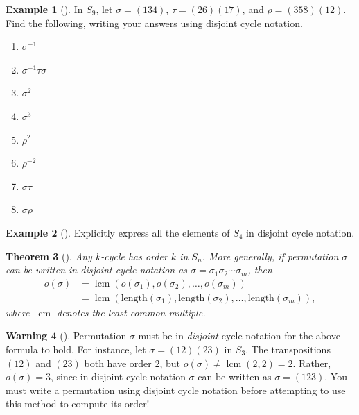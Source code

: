 \documentclass[10pt,]{book}
\theoremstyle{plain}
\newtheorem{theorem}{Theorem}[section]
\theoremstyle{definition}
\theoremstyle{definition}
\newtheorem{warning}[theorem]{Warning}
\theoremstyle{definition}
\newtheorem{example}[theorem]{Example}
\theoremstyle{definition}
\numberwithin{equation}{section}
\DeclareMathOperator{\lcm}{lcm}
\newcommand{\amp}{&}
\begin{document}
\begin{example}[]\label{s9ex}
In \(S_9\), let \(\sigma=(134)\), \(\tau=(26)(17)\), and \(\rho=(358)(12)\). Find the following, writing your answers using disjoint cycle notation.%
\leavevmode%
\begin{multicols}{4}
\begin{enumerate}[label=\alph*]
\item\hypertarget{li-333}{}\(\sigma^{-1}\)%
\item\hypertarget{li-334}{}\(\sigma^{-1}\tau\sigma\)%
\item\hypertarget{li-335}{}\(\sigma^2\)%
\item\hypertarget{li-336}{}\(\sigma^3\)%
\item\hypertarget{li-337}{}\(\rho^2\)%
\item\hypertarget{li-338}{}\(\rho^{-2}\)%
\item\hypertarget{li-339}{}\(\sigma \tau\)%
\item\hypertarget{li-340}{}\(\sigma \rho\)%
\end{enumerate}
\end{multicols}
\end{example}
\begin{example}[]\label{example-56}
Explicitly express all the elements of \(S_4\) in disjoint cycle notation.%
\end{example}
\begin{theorem}[{}]\label{kcyc}
Any \(k\)-cycle has order \(k\) in \(S_n\). More generally, if permutation \(\sigma\) can be written in disjoint cycle notation as \(\sigma=\sigma_1 \sigma_2 \cdots \sigma_m\), then%
\begin{align*}
o(\sigma)\amp =\lcm(o(\sigma_1), o(\sigma_2),\ldots, o(\sigma_m))\\
\amp =\lcm(\mathrm{length}(\sigma_1),\mathrm{length}(\sigma_2),\ldots,\mathrm{length}(\sigma_m)),
\end{align*}
where \(\lcm\) denotes the least common multiple.%
\end{theorem}
\begin{warning}[]\label{warning-18}
Permutation \(\sigma\) must be in \emph{disjoint} cycle notation for the above formula to hold. For instance, let \(\sigma=(12)(23)\) in \(S_3\). The transpositions \((12)\) and \((23)\) both have order \(2\), but \(o(\sigma)\neq \lcm(2,2)=2\). Rather, \(o(\sigma)=3\), since in disjoint cycle notation \(\sigma\) can be written as \(\sigma=(123)\). You must write a permutation using disjoint cycle notation before attempting to use this method to compute its order!%
\end{warning}
\end{document}
